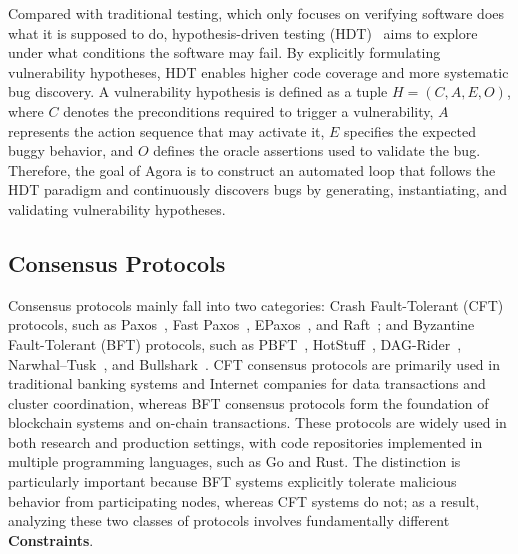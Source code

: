 \documentclass{article}
\theoremstyle{plain}
\theoremstyle{definition}
\theoremstyle{remark}
\newcommand{\consensustester}{Agora\xspace}
\begin{document}

Compared with traditional testing, which only focuses on verifying software does what it is supposed to do, hypothesis-driven testing (HDT)~\cite{Kell2004HereIT} aims to explore under what conditions the software may fail. By explicitly formulating vulnerability hypotheses, HDT enables higher code coverage and more systematic bug discovery. A vulnerability hypothesis is defined as a tuple $H = (C, A, E, O)$, where $C$ denotes the preconditions required to trigger a vulnerability, $A$ represents the action sequence that may activate it, $E$ specifies the expected buggy behavior, and $O$ defines the oracle assertions used to validate the bug.
Therefore, the goal of \consensustester is to construct an automated loop that follows the HDT paradigm and continuously discovers bugs by generating, instantiating, and validating vulnerability hypotheses.


\subsection{Consensus Protocols}
Consensus protocols mainly fall into two categories: Crash Fault-Tolerant (CFT) protocols, such as Paxos~\cite{Lamport1998ThePP,Lamport2001PaxosMS}, Fast Paxos~\cite{Lamport2006FastP}, EPaxos~\cite{Moraru2013ThereIM}, and Raft~\cite{Ongaro2014InSO}; and Byzantine Fault-Tolerant (BFT) protocols, such as PBFT~\cite{Castro1999PracticalBF}, HotStuff~\cite{Yin2018HotStuffBC}, DAG-Rider~\cite{Keidar2021AllYN}, Narwhal–Tusk~\cite{Danezis2021NarwhalAT}, and Bullshark~\cite{Giridharan2022BullsharkDB}.
CFT consensus protocols are primarily used in traditional banking systems and Internet companies for data transactions and cluster coordination, whereas BFT consensus protocols form the foundation of blockchain systems and on-chain transactions. These protocols are widely used in both research and production settings, with code repositories implemented in multiple programming languages, such as Go and Rust. The distinction is particularly important because BFT systems explicitly tolerate malicious behavior from participating nodes, whereas CFT systems do not; as a result, analyzing these two classes of protocols involves fundamentally different \textbf{Constraints}.
\end{document}
